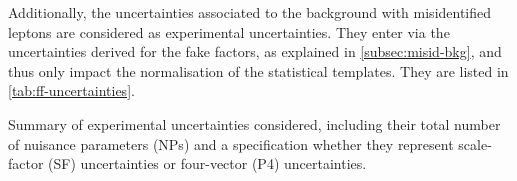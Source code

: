 
Additionally, the uncertainties associated to the background with misidentified leptons are considered as experimental uncertainties. They enter via the uncertainties derived for the fake factors, as explained in \cref{subsec:misid-bkg}, and thus only impact the normalisation of the statistical templates.
They are listed in \cref{tab:ff-uncertainties}.





\begin{table}[ht]
    \begin{center}
        
    \end{center}
    \caption{Summary of experimental uncertainties considered, including their total number of nuisance parameters (NPs) and a specification whether they represent scale-factor (SF) uncertainties or four-vector (P4) uncertainties.
    }
    \label{tab:exp-uncertainties}
\end{table}




